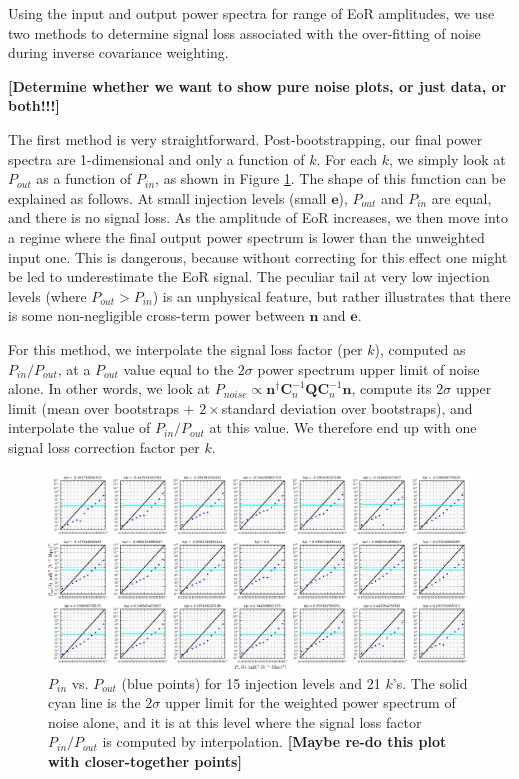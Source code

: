 \documentclass[preprint2,numberedappendix,tighten,twocolappendix]{aastex6}  %
\newcommand{\cc}[1]{{\color{purple} \textbf{[#1]}}}
\begin{document}
Using the input and output power spectra for range of EoR amplitudes, we use two methods to determine signal loss associated with the over-fitting of noise during inverse covariance weighting. 

\cc{Determine whether we want to show pure noise plots, or just data, or both!!!}

The first method is very straightforward. Post-bootstrapping, our final power spectra are 1-dimensional and only a function of $k$. For each $k$, we simply look at $P_{out}$ as a function of $P_{in}$, as shown in Figure \ref{fig:sigloss1_noise}. The shape of this function can be explained as follows. At small injection levels (small $\textbf{e}$), $P_{out}$ and $P_{in}$ are equal, and there is no signal loss. As the amplitude of EoR increases, we then move into a regime where the final output power spectrum is lower than the unweighted input one. This is dangerous, because without correcting for this effect one might be led to underestimate the EoR signal. The peculiar tail at very low injection levels (where $P_{out} > P_{in}$) is an unphysical feature, but rather illustrates that there is some non-negligible cross-term power between $\textbf{n}$ and $\textbf{e}$.

For this method, we interpolate the signal loss factor (per $k$), computed as $P_{in}/P_{out}$, at a $P_{out}$ value equal to the $2\sigma$ power spectrum upper limit of noise alone. In other words, we look at $P_{noise} \propto \textbf{n}^{\dagger}\textbf{C}_{n}^{-1}\textbf{Q}\textbf{C}_{n}^{-1}\textbf{n}$, compute its $2\sigma$ upper limit (mean over bootstraps + $2 \times $standard deviation over bootstraps), and interpolate the value of $P_{in}/P_{out}$ at this value. We therefore end up with one signal loss correction factor per $k$. 

\begin{figure}
	\centering
	\includegraphics[width=1.0\textwidth]{plots/sigloss1_noise.png}
	\caption{$P_{in}$ vs. $P_{out}$ (blue points) for 15 injection levels and 21 $k$'s. The solid cyan line is the $2\sigma$ upper limit for the weighted power spectrum of noise alone, and it is at this level where the signal loss factor $P_{in}/P_{out}$ is computed by interpolation. \cc{Maybe re-do this plot with closer-together points}}
	\label{fig:sigloss1_noise}
\end{figure}
\end{document}
